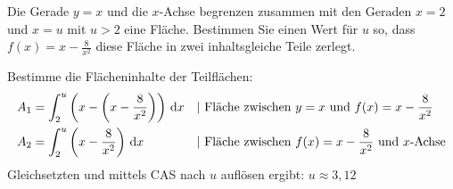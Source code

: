 Die Gerade $y=x$ und die $x$-Achse begrenzen zusammen mit den Geraden $x=2$ und $x=u$ mit $u>2$ eine Fläche. Bestimmen Sie einen Wert für $u$ so, dass $f(x)=x-\frac{8}{x^2}$ diese Fläche in zwei inhaltsgleiche Teile zerlegt. \cas
\begin{lsg}{}
  Bestimme die Flächeninhalte der Teilflächen:\begin{align*}
  A_1&=\int_2^u\left(x-\left(x-\frac{8}{x^2}\right)\right)\d x&&|\ \text{Fläche zwischen $y=x$ und $f(x)=x-\frac{8}{x^2}$}\\
  A_2&= \int_2^u\left(x-\frac{8}{x^2}\right)\d x&&|\ \text{Fläche zwischen $f(x)=x-\frac{8}{x^2}$ und $x$-Achse}
  \end{align*}
  Gleichsetzten und mittels CAS nach $u$ auflösen ergibt: $u\approx 3,12$
\end{lsg}


